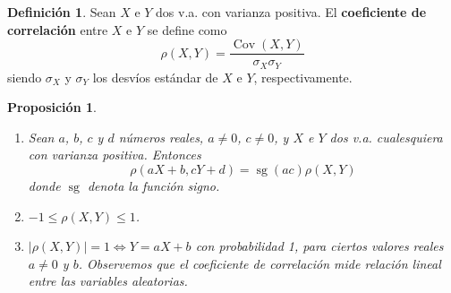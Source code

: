 \documentclass[11pt]{article}
\theoremstyle{plain}
\newtheorem*{pro}{Proposición}
\theoremstyle{definition}
\newtheorem*{defi}{Definición}
\theoremstyle{remark}
\newcommand{\deft}[1]{\textbf{#1}}  %
\newcommand{\cov}[0]{\ensuremath{\operatorname{Cov}}}  %
\begin{document}
      \begin{defi}
        Sean $X$ e $Y$ dos v.a. con varianza positiva. El \deft{coeficiente de correlación} entre $X$ e $Y$ se define como
        \[ \rho(X,Y) = \frac{\cov(X,Y)}{\sigma_X \sigma_Y} \]
        siendo $\sigma_X$ y $\sigma_Y$ los desvíos estándar de $X$ e $Y$, respectivamente.
      \end{defi}

      \begin{pro} \
        \begin{enumerate}
          \item Sean $a$, $b$, $c$ y $d$ números reales, $a \neq 0$, $c \neq 0$, y $X$ e $Y$ dos v.a. cualesquiera con varianza positiva. Entonces
          \[ \rho(aX + b, cY + d) = \operatorname{sg}(ac) \rho(X,Y) \]
          donde $\operatorname{sg}$ denota la función signo.

          \item $-1 \leq \rho(X,Y) \leq 1$.

          \item $\vert \rho(X,Y) \vert = 1 \Leftrightarrow Y = aX + b$ con probabilidad 1, para ciertos valores reales $a \neq 0$ y $b$. Observemos que el coeficiente de correlación mide \emph{relación lineal} entre las variables aleatorias.
        \end{enumerate}
      \end{pro}
\end{document}
